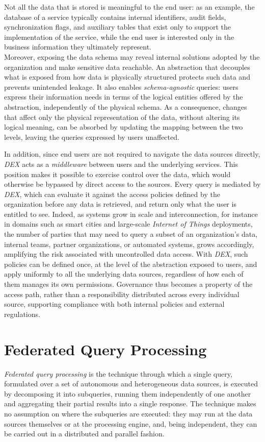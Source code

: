 Not all the data that is stored is meaningful to the end user: as an example,
the database of a service typically contains internal identifiers, audit
fields, synchronization flags, and auxiliary tables that exist only to support
the implementation of the service, while the end user is interested only in
the business information they ultimately represent. \\
Moreover, exposing the data schema may reveal internal solutions
adopted by the organization and make sensitive data reachable. An abstraction
that decouples what is exposed from how data is physically structured protects
such data and prevents unintended leakage. It also enables \textit{schema-agnostic}
queries: users express their information needs in terms of the logical entities
offered by the abstraction, independently of the physical schema. As a
consequence, changes that affect only the physical representation of the data,
without altering its logical meaning, can be absorbed by updating the mapping
between the two levels, leaving the queries expressed by users unaffected.

In addition, since end users are not required to navigate the data sources
directly, \textit{DEX} acts as a \textit{middleware} between users and the
underlying services. This position makes it possible to exercise control over
the data, which would otherwise be bypassed by direct access to the sources.
Every query is mediated by \textit{DEX}, which can evaluate it against the
access policies defined by the organization before any data is retrieved, and
return only what the user is entitled to see. Indeed, as systems grow in scale
and interconnection, for instance in domains such as smart cities and
large-scale \textit{Internet of Things} deployments, the number of parties that
may need to query a subset of an organization's data, internal teams, partner
organizations, or automated systems, grows accordingly, amplifying the risk
associated with uncontrolled data access. With \textit{DEX}, such policies can
be defined once, at the level of the abstraction exposed to users, and apply
uniformly to all the underlying data sources, regardless of how each of them
manages its own permissions. Governance thus becomes a property of the access
path, rather than a responsibility distributed across every individual source,
supporting compliance with both internal policies and external regulations.


\section{Federated Query Processing}
\textit{Federated query processing} is the technique through which a single
query, formulated over a set of autonomous and heterogeneous data sources, is
executed by decomposing it into subqueries, running them independently of one
another and aggregating their partial results into a single response.
The technique makes no assumption on where the subqueries are executed: they may 
run at the data sources themselves or at the processing engine, and, being
independent, they can be carried out in a distributed and parallel fashion.

